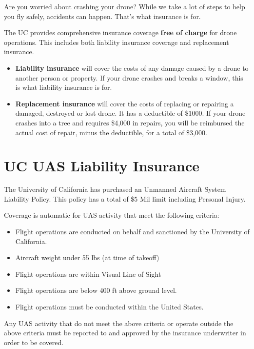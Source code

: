 \documentclass[
  12pt,
]{book}
\providecommand{\tightlist}{%
  \setlength{\itemsep}{0pt}\setlength{\parskip}{0pt}}
\begin{document}
Are you worried about crashing your drone? While we take a lot of steps to help you fly safely, accidents can happen. That's what insurance is for.

The UC provides comprehensive insurance coverage \textbf{free of charge} for drone operations. This includes both liability insurance coverage and replacement insurance.

\begin{itemize}
\tightlist
\item
  \textbf{Liability insurance} will cover the costs of any damage caused by a drone to another person or property. If your drone crashes and breaks a window, this is what liability insurance is for.
\item
  \textbf{Replacement insurance} will cover the costs of replacing or repairing a damaged, destroyed or lost drone. It has a deductible of \$1000. If your drone crashes into a tree and requires \$4,000 in repairs, you will be reimbursed the actual cost of repair, minus the deductible, for a total of \$3,000.
\end{itemize}

\hypertarget{liability-insurance}{%
\section{UC UAS Liability Insurance}\label{liability-insurance}}

The University of California has purchased an Unmanned Aircraft System Liability Policy. This policy has a total of \$5 Mil limit including Personal Injury.

Coverage is automatic for UAS activity that meet the following criteria:

\begin{itemize}
\tightlist
\item
  Flight operations are conducted on behalf and sanctioned by the University of California.
\item
  Aircraft weight under 55 lbs (at time of takeoff)
\item
  Flight operations are within Visual Line of Sight
\item
  Flight operations are below 400 ft above ground level.
\item
  Flight operations must be conducted within the United States.
\end{itemize}

Any UAS activity that do not meet the above criteria or operate outside the above criteria must be reported to and approved by the insurance underwriter in order to be covered.
\end{document}
